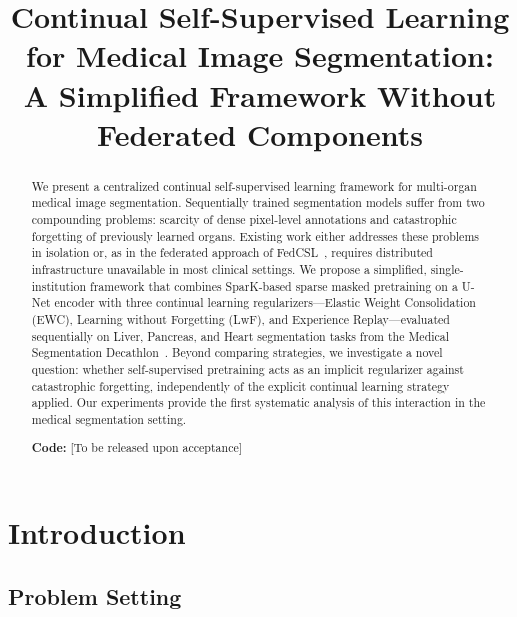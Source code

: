 \documentclass[conference]{IEEEtran}
\begin{document}
\title{Continual Self-Supervised Learning for Medical Image Segmentation:\\
A Simplified Framework Without Federated Components}

\author{
}

\maketitle

\begin{abstract}
We present a centralized continual self-supervised learning framework for multi-organ medical image segmentation. Sequentially trained segmentation models suffer from two compounding problems: scarcity of dense pixel-level annotations and catastrophic forgetting of previously learned organs. Existing work either addresses these problems in isolation or, as in the federated approach of FedCSL~\cite{fedcsl2025}, requires distributed infrastructure unavailable in most clinical settings. We propose a simplified, single-institution framework that combines SparK-based sparse masked pretraining on a U-Net encoder with three continual learning regularizers—Elastic Weight Consolidation (EWC), Learning without Forgetting (LwF), and Experience Replay—evaluated sequentially on Liver, Pancreas, and Heart segmentation tasks from the Medical Segmentation Decathlon~\cite{simpson2022decathlon}. Beyond comparing strategies, we investigate a novel question: whether self-supervised pretraining acts as an implicit regularizer against catastrophic forgetting, independently of the explicit continual learning strategy applied. Our experiments provide the first systematic analysis of this interaction in the medical segmentation setting.

\textbf{Code:} [To be released upon acceptance]
\end{abstract}

\section{Introduction}

\subsection{Problem Setting}
\end{document}
